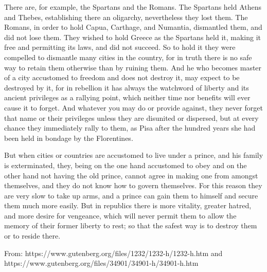\begin{linenumbers}
\indent There are, for example, the Spartans and the Romans. The Spartans held Athens and Thebes, establishing there an oligarchy, nevertheless they lost them. The Romans, in order to hold Capua, Carthage, and Numantia, dismantled them, and did not lose them. They wished to hold Greece as the Spartans held it, making it free and permitting its laws, and did not succeed. So to hold it they were compelled to dismantle many cities in the country, for in truth there is no safe way to retain them otherwise than by ruining them. And he who becomes master of a city accustomed to freedom and does not destroy it, may expect to be destroyed by it, for in rebellion it has always the watchword of liberty and its ancient privileges as a rallying point, which neither time nor benefits will ever cause it to forget. And whatever you may do or provide against, they never forget that name or their privileges unless they are disunited or dispersed, but at every chance they immediately rally to them, as Pisa after the hundred years she had been held in bondage by the Florentines.

\indent But when cities or countries are accustomed to live under a prince, and his family is exterminated, they, being on the one hand accustomed to obey and on the other hand not having the old prince, cannot agree in making one from amongst themselves, and they do not know how to govern themselves. For this reason they are very slow to take up arms, and a prince can gain them to himself and secure them much more easily. But in republics there is more vitality, greater hatred, and more desire for vengeance, which will never permit them to allow the memory of their former liberty to rest; so that the safest way is to destroy them or to reside there.
\end{linenumbers}

From: https://www.gutenberg.org/files/1232/1232-h/1232-h.htm and https://www.gutenberg.org/files/34901/34901-h/34901-h.htm

